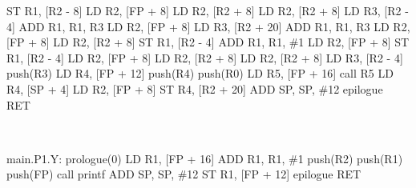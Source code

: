 \documentclass[12pt,fleqn]{article}		%
\begin{document}
\begin{enumerate}
\begin{algorithmic}
\State ST R1, [R2 - 8]
\State {}
\State LD R2, [FP + 8]
\State LD R2, [R2 + 8]
\State LD R2, [R2 + 8]
\State LD R3, [R2 - 4]
\State ADD R1, R1, R3
\State LD R2, [FP + 8]
\State LD R3, [R2 + 20]
\State ADD R1, R1, R3
\State LD R2, [FP + 8]
\State LD R2, [R2 + 8]
\State ST R1, [R2 - 4]
\State {}
\State ADD R1, R1, \#1
\State LD R2, [FP + 8]
\State ST R1, [R2 - 4]
\State {}
\State LD R2, [FP + 8]
\State LD R2, [R2 + 8]
\State LD R2, [R2 + 8]
\State LD R3, [R2 - 4]
\State push(R3) 
\State LD R4, [FP + 12]
\State push(R4) 
\State push(R0) 
\State LD R5, [FP + 16] 
\State call R5
\State LD R4, [SP + 4] 
\State LD R2, [FP + 8]
\State ST R4, [R2 + 20]
\State ADD SP, SP, \#12 
\State epilogue
\State RET
\end{algorithmic}
\ \\
\begin{algorithmic}
\State main.P1.Y:
\State prologue(0)
\State {}
\State LD R1, [FP + 16]
\State ADD R1, R1, \#1
\State {}
\State push(R2) 
\State push(R1) 
\State push(FP) 
\State call printf
\State ADD SP, SP, \#12 
\State {}
\State ST R1, [FP + 12] 
\State epilogue
\State RET
\end{algorithmic}

\end{enumerate}
\end{document}
